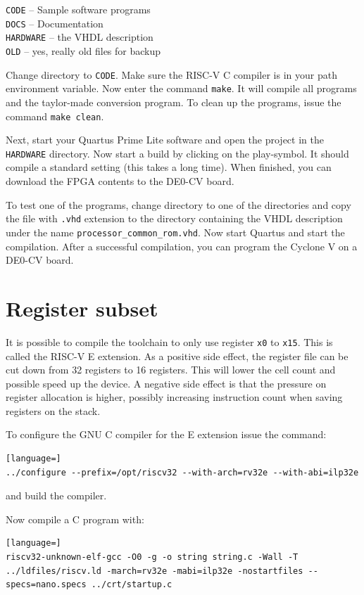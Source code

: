 \documentclass[12pt]{article}
\begin{document}
\texttt{CODE} -- Sample software programs\\
\texttt{DOCS} -- Documentation\\
\texttt{HARDWARE} -- the VHDL description \\
\texttt{OLD} -- yes, really old files for backup

Change directory to \texttt{CODE}. Make sure the RISC-V C compiler is in your path environment variable. Now enter the command \texttt{make}. It will compile all programs and the taylor-made conversion program. To clean up the programs, issue the command \texttt{make clean}.

Next, start your Quartus Prime Lite software and open the project in the \texttt{HARDWARE} directory. Now start a build by clicking on the play-symbol. It should compile a standard setting (this takes a long time). When finished, you can download the FPGA contents to the DE0-CV board.

To test one of the programs, change directory to one of the directories and copy the file with \texttt{.vhd} extension to the directory containing the VHDL description under the name \texttt{processor\_common\_rom.vhd}.
Now start Quartus and start the compilation. After a successful compilation, you can program the Cyclone V on a DE0-CV board.

\section{Register subset}
It is possible to compile the toolchain to only use register \texttt{x0} to \texttt{x15}. This is called the RISC-V E extension. As a positive side effect, the register file can be cut down from 32 registers to 16 registers. This will lower the cell count and possible speed up the device. A negative side effect is that the pressure on register allocation is higher, possibly increasing instruction count when saving registers on the stack.

To configure the GNU C compiler for the E extension issue the command:

\begin{lstlisting}[language=]
../configure --prefix=/opt/riscv32 --with-arch=rv32e --with-abi=ilp32e
\end{lstlisting}

and build the compiler.

Now compile a C program with:

\begin{lstlisting}[language=]
riscv32-unknown-elf-gcc -O0 -g -o string string.c -Wall -T ../ldfiles/riscv.ld -march=rv32e -mabi=ilp32e -nostartfiles --specs=nano.specs ../crt/startup.c
\end{lstlisting}
\end{document}
